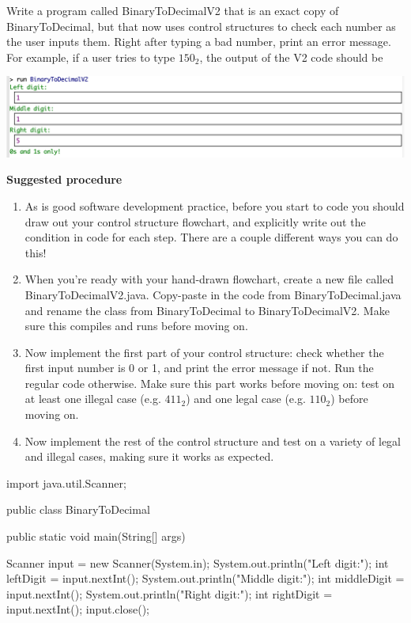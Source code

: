 \documentclass[answers,addpoints]{exam} %
\begin{document}
\begin{questions}
Write a program called BinaryToDecimalV2 that is an exact copy of BinaryToDecimal, but that now uses control structures to check each number as the user inputs them. Right after typing a bad number, print an error message. For example, if a user tries to type $150_2$, the output of the V2 code should be

\includegraphics{binaryExampleError}

\textbf{Suggested procedure} 

\begin{enumerate}
\item As is good software development practice, before you start to code you should draw out your control structure flowchart, and explicitly write out the condition in code for each step. There are a couple different ways you can do this!

\item When you're ready with your hand-drawn flowchart, create a new file called BinaryToDecimalV2.java. Copy-paste in the code from BinaryToDecimal.java and rename the class from BinaryToDecimal to BinaryToDecimalV2. Make sure this compiles and runs before moving on. 

\item Now implement the first part of your control structure: check whether the first input number is 0 or 1, and print the error message if not. Run the regular code otherwise. Make sure this part works before moving on: test on at least one illegal case (e.g. $411_2$) and one legal case (e.g. $110_2$) before moving on. 

\item Now implement the rest of the control structure and test on a variety of legal and illegal cases, making sure it works as expected. 

\end{enumerate}

\begin{solution}

\begin{code}
import java.util.Scanner;

public class BinaryToDecimal {
  public static void main(String[] args) {  
    Scanner input = new Scanner(System.in);
    System.out.println("Left digit:");
    int leftDigit = input.nextInt();
    System.out.println("Middle digit:");
    int middleDigit = input.nextInt();
    System.out.println("Right digit:");
    int rightDigit = input.nextInt();
    input.close();
      
}}
\end{code}
\end{solution}
\end{questions}
\end{document}

